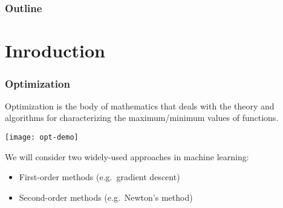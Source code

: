 \documentclass[smaller]{beamer}
\title[\shortlecturetitle]{ {\normalsize \coursetitle}
  \\ \longlecturetitle}
\date[\lecturedate]{\footnotesize \lecturedate}
\author{{\bf \instructor}}
\institute[UMass Amherst]{
  \begin{tikzpicture}[baseline=(current bounding box.center)]
    \node[anchor=base] at (-7,0) (its) {\texttt{[image: UMassEngineering\_vert]}} ;
  \end{tikzpicture}
}
\newcommand{\?}{\stackrel{?}{=}}
\begin{document}
\maketitle

\begin{frame}
  \frametitle{Outline}
  \tableofcontents
\end{frame}

\section{Inroduction}



  \begin{frame}
  \frametitle{Optimization}\pause
  Optimization is the body of mathematics that deals with the theory and algorithms for characterizing the maximum/minimum values of functions.\pause

  \begin{center}
    \texttt{[image: opt-demo]}
  \end{center}

  \pause

  We will consider two widely-used approaches in machine learning:\pause

  \begin{itemize}[<+->]
  \item First-order methods (e.g.\ gradient descent)
  \item Second-order methods (e.g.\ Newton's method)
  \end{itemize}
\end{frame}
\end{document}
